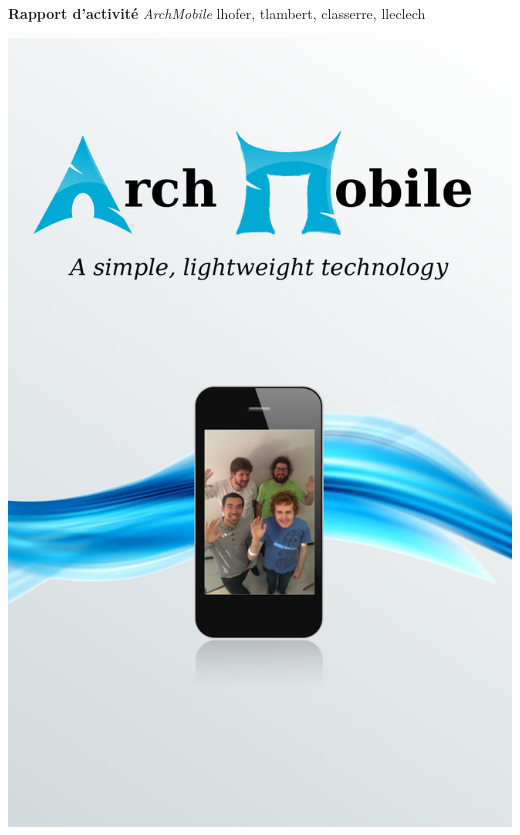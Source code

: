 \documentclass[a4paper, 12pt]{article}
\def\projet{Rapport d'activité}
\def\titre{ArchMobile}
\def\others{lhofer, tlambert, classerre, lleclech}
\begin{document}
\begin{center}
\vspace*{10mm}
\Huge{\bfseries \sffamily \projet}
\vskip 20mm
\huge{ \itshape \titre}
\vskip 10mm
\huge{ \sffamily \others}
\vskip 5mm
\end{center}


\vskip 15mm
\begin{minipage}{.49\textwidth}
  \includegraphics[width=\linewidth]{flyer}
\end{minipage}
\end{document}
